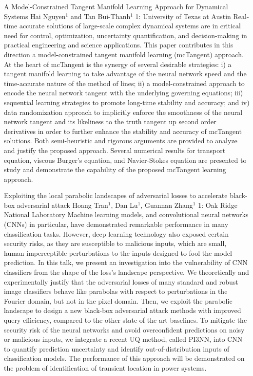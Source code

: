 \begin{addmargin}[2em]{0em}
\vspace{1.5ex}
\abs
{A Model-Constrained Tangent Manifold Learning Approach for Dynamical Systems}
{Hai Nguyen$^1$ and Tan Bui-Thanh$^1$}
{1: University of Texas at Austin}
{Real-time accurate solutions of large-scale complex dynamical systems are in critical need for control, optimization, uncertainty quantification, and decision-making in practical engineering and science applications. This paper contributes in this direction a model-constrained tangent manifold learning (mcTangent) approach. At the heart of mcTangent is the synergy of several desirable strategies: i) a tangent manifold learning to take advantage of the neural network speed and the time-accurate nature of the method of lines; ii) a model-constrained approach to encode the neural network tangent with the underlying governing equations; iii) sequential learning strategies to promote long-time stability and accuracy; and iv) data randomization approach to implicitly enforce the smoothness of the neural network tangent and its likeliness to the truth tangent up second order derivatives in order to further enhance the stability and accuracy of mcTangent solutions. Both semi-heuristic and rigorous arguments are provided to analyze and justify the proposed approach. Several numerical results for transport equation, viscous Burger's equation, and Navier-Stokes equation are presented to study and demonstrate the capability of the proposed mcTangent learning approach.}


\vspace{1.5ex}
\abs
{Exploiting the local parabolic landscapes of adversarial losses to accelerate black-box adversarial attack}
{Hoang Tran$^{1}$, Dan Lu$^{1}$, Guannan Zhang$^{1}$}
{1: Oak Ridge National Laboratory}
{Machine learning models, and convolutional neural networks (CNNs) in particular, have demonstrated remarkable performance in many classification tasks. However, deep learning technology also exposed certain security risks, as they are susceptible to malicious inputs, which are small, human-imperceptible perturbations to the inputs designed to fool the model prediction. In this talk, we present an investigation into the vulnerability of CNN classifiers from the shape of the loss’s landscape perspective. We theoretically and experimentally justify that the adversarial losses of many standard and robust image classifiers behave like parabolas with respect to perturbations in the Fourier domain, but not in the pixel domain. Then, we exploit the parabolic landscape to design a new black-box adversarial attack methods with improved query efficiency, compared to the other state-of-the-art baselines. To mitigate the security risk of the neural networks and avoid overconfident predictions on noisy or malicious inputs, we integrate a recent UQ method, called PI3NN, into CNN to quantify prediction uncertainty and identify out-of-distribution inputs of classification models. The performance of this approach will be demonstrated on the problem of identification of transient location in power systems.}



\end{addmargin}
